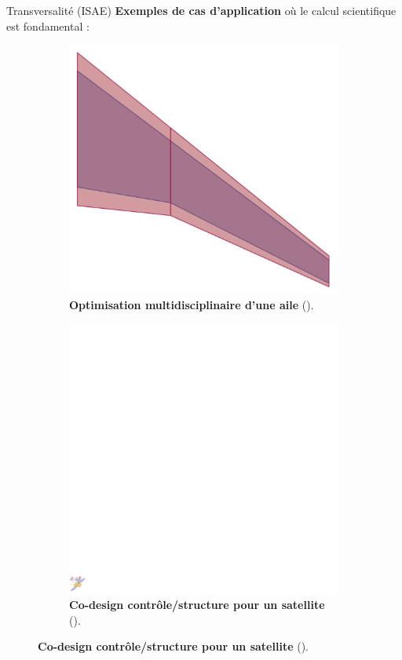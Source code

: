 \documentclass[aspectratio=169, french]{beamer}
\begin{document}
\begin{frame}{Transversalité (ISAE)}
	\textbf{Exemples de cas d'application} où le calcul scientifique est fondamental :
	\begin{figure}[t]
		\begin{subfigure}{0.45\textwidth}
			\includegraphics[height=.45\textheight]{MDO_wing.pdf}%
			\caption*{\textbf{Optimisation multidisciplinaire d'une aile} (\cite{masColomer2021mdo}). }
		\end{subfigure}\hfill
		\begin{subfigure}{0.5\textwidth}
			\includegraphics[height=.45\textheight]{Codesign_satellite.pdf} 
			\caption*{\textbf{Co-design contrôle/structure pour un satellite} (\cite{finozzi2022sub}).}
		\end{subfigure}
	\end{figure}
	
\end{frame}
\end{document}
